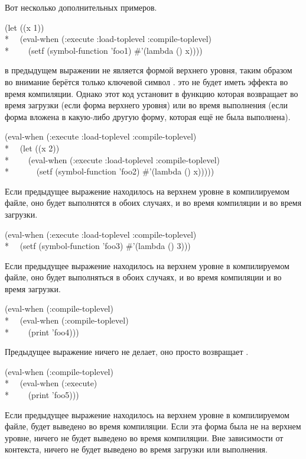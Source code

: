 \begin{defspec}
\begin{itemize}
\end{itemize}

Вот несколько дополнительных примеров.
\begin{lisp} 
  (let ((x 1)) \\*
  ~~(eval-when (:execute :load-toplevel :compile-toplevel) \\*
  ~~~~(setf (symbol-function 'foo1) \#'(lambda () x))))
\end{lisp}
 в предыдущем выражении не является формой верхнего уровня, таким
образом во внимание берётся только ключевой символ . это не будет
иметь эффекта во время компиляции. Однако этот код установит
в  функцию которая возвращает  во время
загрузки (если  форма верхнего уровня) или во время выполнения (если
форма  вложена в какую-либо другую форму, которая ещё не была
выполнена). 
\begin{lisp}
  (eval-when (:execute :load-toplevel :compile-toplevel) \\*
  ~~(let ((x 2)) \\*
  ~~~~(eval-when (:execute :load-toplevel :compile-toplevel) \\*
  ~~~~~~(setf (symbol-function 'foo2) \#'(lambda () x)))))
\end{lisp}
Если предыдущее выражение находилось на верхнем уровне в компилируемом файле, оно
будет выполнятся в обоих случаях, и во время компиляции и во время загрузки.

\begin{lisp}
  (eval-when (:execute :load-toplevel :compile-toplevel) \\*
  ~~(setf (symbol-function 'foo3) \#'(lambda () 3)))
\end{lisp}
Если предыдущее выражение находилось на верхнем уровне в компилируемом файле, оно
будет выполняться в обоих случаях, и во время компиляции и во время загрузки.

\begin{lisp}
  (eval-when (:compile-toplevel) \\*
  ~~(eval-when (:compile-toplevel)  \\*
  ~~~~(print 'foo4)))
\end{lisp}
Предыдущее выражение ничего не делает, оно просто возвращает .

\begin{lisp}
  (eval-when (:compile-toplevel)  \\*
  ~~(eval-when (:execute) \\*
  ~~~~(print 'foo5)))
\end{lisp}
Если предыдущее выражение находилось на верхнем уровне в компилируемом файле,
 будет выведено во время компиляции. Если эта форма была не на верхнем
уровне, ничего не будет выведено во время компиляции. Вне зависимости от 
контекста, ничего не будет выведено во время загрузки или выполнения.


\end{defspec}
